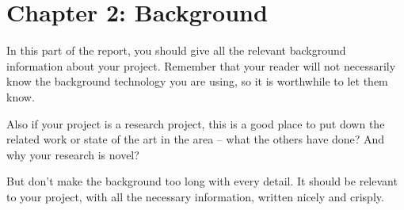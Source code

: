 \section*{Chapter 2: Background}
\setcounter{section}{2} \setcounter{subsection}{0}


In this part of the report, you should give all the relevant background information about your project. Remember that your reader will not necessarily know the background technology you are using, so it is worthwhile to let them know.

Also if your project is a research project, this is a good place to put down the related work or state of the art in the area – what the others have done? And why your research is novel?

But don't make the background too long with every detail. It should be relevant to your project, with all the necessary information, written nicely and crisply.
